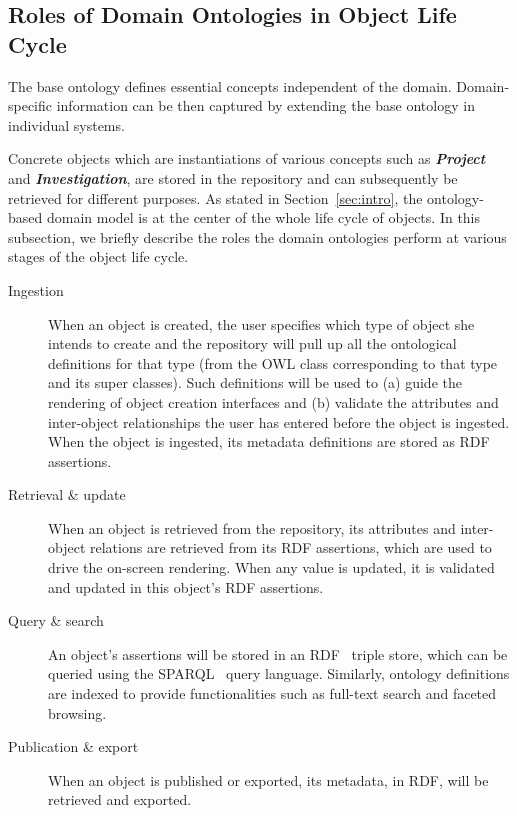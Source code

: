 \documentclass{elsarticle}
\begin{document}
\subsection{Roles of Domain Ontologies in Object Life Cycle}\label{sec:rav}
The base ontology defines essential concepts independent of the domain.
Domain-specific information can be then captured by extending the
base ontology in individual systems.

Concrete objects which are instantiations of various concepts such as
\textbf{\emph{Project}} and \textbf{\emph{Investigation}}, are stored
in the repository and can
subsequently be retrieved for different purposes. As stated in
Section~\ref{sec:intro}, the ontology-based domain model is at the
center of the whole life cycle of objects. In this subsection, we
briefly describe the roles the domain ontologies perform at
various stages of the object life cycle.

\begin{description}
\item[Ingestion] When an object is created, the user specifies which
type of object she intends to create and the repository will pull up
all the ontological definitions for that type (from the OWL class
corresponding to that type and its super classes). Such definitions
will be used to (a) guide the rendering of object creation
interfaces and (b) validate the attributes and inter-object
relationships the user has entered before the object is ingested.
When the object is ingested, its metadata definitions are stored
as RDF assertions.

\item[Retrieval \& update] When an object is retrieved from the repository,
its attributes and inter-object relations are retrieved from its
RDF assertions, which are used to drive the on-screen rendering.
When any value is updated, it is validated and updated in this
object's RDF assertions.

\item[Query \& search] An object's assertions will be stored
in an RDF~\cite{rdfprimer04} triple store, which can be queried
using the SPARQL~\cite{sparql} query language. Similarly, ontology
definitions are indexed to provide functionalities such as full-text
search and faceted browsing.

\item[Publication \& export] When an object is published or exported,
its metadata, in RDF, will be retrieved and exported.
\end{description}
\end{document}
